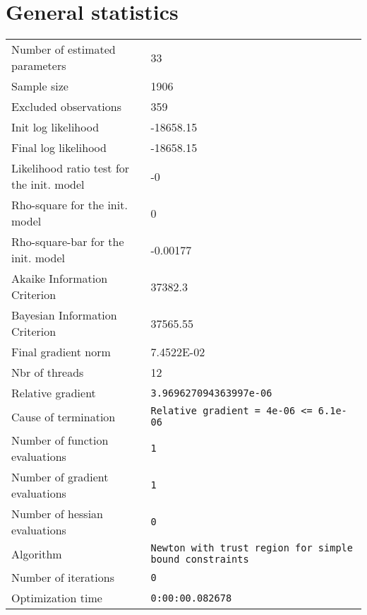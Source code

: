 



\section{General statistics}
\begin{tabular}{ll}
Number of estimated parameters & 33 \\
Sample size & 1906 \\
Excluded observations & 359 \\
Init log likelihood & -18658.15 \\
Final log likelihood & -18658.15 \\
Likelihood ratio test for the init. model & -0 \\
Rho-square for the init. model & 0 \\
Rho-square-bar for the init. model & -0.00177 \\
Akaike Information Criterion & 37382.3 \\
Bayesian Information Criterion & 37565.55 \\
Final gradient norm & 7.4522E-02 \\
Nbr of threads & 12 \\
Relative gradient & \verb$3.969627094363997e-06$ \\
Cause of termination & \verb$Relative gradient = 4e-06 <= 6.1e-06$ \\
Number of function evaluations & \verb$1$ \\
Number of gradient evaluations & \verb$1$ \\
Number of hessian evaluations & \verb$0$ \\
Algorithm & \verb$Newton with trust region for simple bound constraints$ \\
Number of iterations & \verb$0$ \\
Optimization time & \verb$0:00:00.082678$ \\
\end{tabular}

